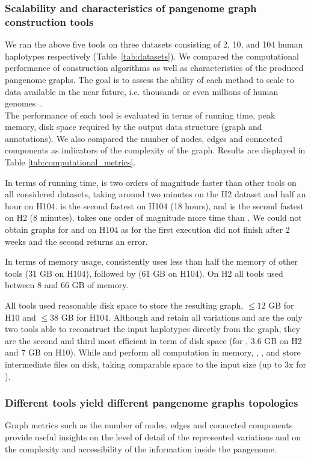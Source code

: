 \subsubsection*{\textbf{Scalability and characteristics of pangenome graph construction tools \label{sec:results}}}
\label{sec:scalablility}
We ran the above five tools on three datasets consisting of 2, 10, and 104 human haplotypes respectively (Table~\mbox{\ref{tab:datasets}}). We compared the computational performance of construction algorithms as well as characteristics of the produced pangenome graphs.
The goal is to assess the ability of each method to scale to data available in the near future, i.e. thousands or even millions of human genomes~\cite{human-pangenomics-era}. \\
The performance of each tool is evaluated in terms of running time, peak memory, disk space required by the output data structure (graph and annotations). We also compared the number of nodes, edges and connected components as indicators of the complexity of the graph. Results are displayed in Table \ref{tab:computational_metrics}. 

In terms of running time, \mdbg is two orders of magnitude faster than other tools on all considered datasets, taking around two minutes on the H2 dataset and half an hour on H104.
\bifrost is the second fastest on H104 (18 hours), and \minigraph is the second fastest on H2 (8 minutes). \mcactus takes one order of magnitude more time than \minigraph. We could not obtain graphs for \pggb and \mcactus on H104 as for the first execution did not finish after 2 weeks and the second returns an error. 

In terms of memory usage, \mdbg consistently uses less than half the memory of other tools (31 GB on H104), followed by \minigraph (61 GB on H104). On H2 all tools used between 8 and 66 GB of memory.

All tools used reasonable disk space to store the resulting graph, $\leq 12$ GB for H10 and $\leq 38$ GB for H104. Although \mcactus and \pggb retain all variations and are the only two tools able to reconstruct the input haplotypes directly from the graph, they are the second and third most efficient in term of disk space (for \mcactus, 3.6 GB on H2 and 7 GB on H10). 
While \bifrost and \minigraph perform all computation in memory, \pggb, \mcactus, and \mdbg store intermediate files on disk, taking comparable space to the input size (up to 3x for \mcactus).  \\

\subsubsection*{\textbf{Different tools yield different pangenome graphs topologies}}
Graph metrics such as the number of nodes, edges and connected components provide useful insights on the level of detail of the represented variations and on the complexity and accessibility of the information inside the pangenome.

